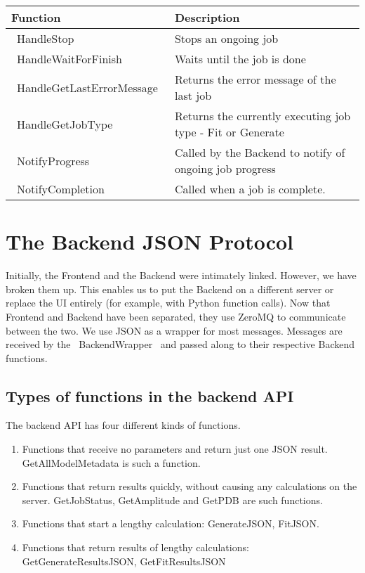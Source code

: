 \documentclass[12pt]{article}
\begin{document}
	\begin{tabular}{|l|p{7cm}|}
		\hline
		\textbf{Function} & \textbf{Description} \\ \hline
		~HandleStop~ & Stops an ongoing job \\ \hline
		~HandleWaitForFinish~ & Waits until the job is done \\ \hline
		~HandleGetLastErrorMessage~ & Returns the error message of the last job \\ \hline
		~HandleGetJobType~ & Returns the currently executing job type - Fit or Generate \\ \hline
		~NotifyProgress~ & Called by the Backend to notify of ongoing job progress \\ \hline
		~NotifyCompletion~ & Called when a job is complete. \\ \hline
	\end{tabular}

\section{The Backend JSON Protocol}
Initially, the Frontend and the Backend were intimately linked. However, we have broken them up. This enables us to put the Backend on a different server or replace the UI entirely (for example, with Python function calls). Now that Frontend and Backend have been separated, they use ZeroMQ to communicate between the two. We use JSON as a wrapper for most messages. Messages are received by the ~BackendWrapper~ and passed along to their respective Backend functions.

\subsection{Types of functions in the backend API}
The backend API has four different kinds of functions.
	\begin{enumerate}
		\item Functions that receive no parameters and return just one JSON result. GetAllModelMetadata is such a function.
		\item Functions that return results quickly, without causing any calculations on the server. GetJobStatus, GetAmplitude and GetPDB are such functions.
		\item Functions that start a lengthy calculation: GenerateJSON, FitJSON.
		\item Functions that return results of lengthy calculations: GetGenerateResultsJSON, GetFitResultsJSON
	\end{enumerate}
\end{document}
